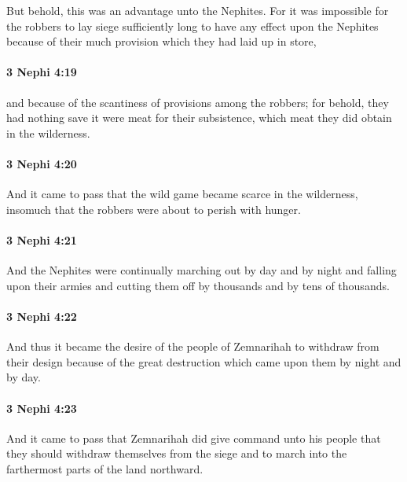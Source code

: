 			But behold, this was an advantage unto the Nephites.
			For it was impossible for the robbers to lay siege sufficiently long
			to have any effect upon the Nephites
			because of their much provision which they had laid up in store,

		\paragraph{3 Nephi 4:19} %
			\label{3NEPHI-4-19}

			and because of the scantiness of provisions among the robbers;
			for behold, they had nothing save it were meat for their subsistence,
			which meat they did obtain in the wilderness.

		\paragraph{3 Nephi 4:20} %
			\label{3NEPHI-4-20}

			And it came to pass that the wild game became scarce in the wilderness,
			insomuch that the robbers were about to perish with hunger.

		\paragraph{3 Nephi 4:21} %
			\label{3NEPHI-4-21}

			And the Nephites were continually marching out by day and by night
			and falling upon their armies
			and cutting them off by thousands and by tens of thousands.

		\paragraph{3 Nephi 4:22} %
			\label{3NEPHI-4-22}

			And thus it became the desire of the people of Zemnarihah
			to withdraw from their design
			because of the great destruction which came upon them by night and by day.

		\paragraph{3 Nephi 4:23} %
			\label{3NEPHI-4-23}

			And it came to pass that Zemnarihah did give command unto his people
			that they should withdraw themselves from the siege
			and to march into the farthermost parts of the land northward.

